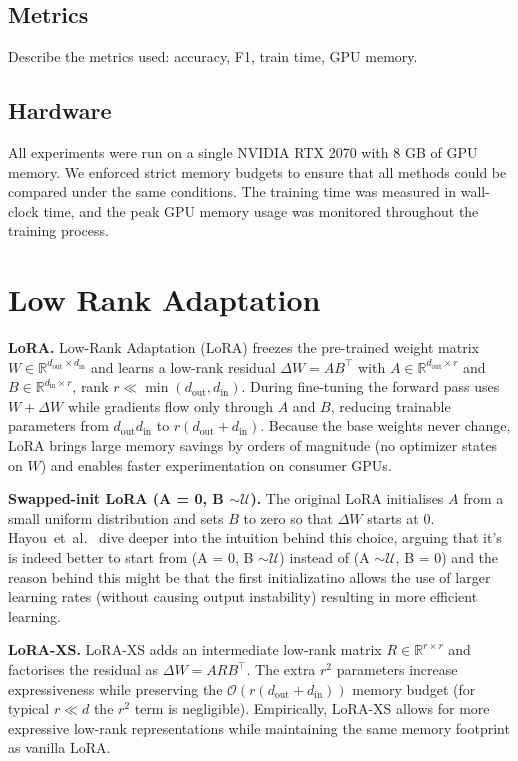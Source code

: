 \documentclass[a4paper,10pt,twocolumn,english]{article}
\begin{document}
\subsection{Metrics} Describe the metrics used: accuracy, F1, train time, GPU memory.

\subsection{Hardware} All experiments were run on a single NVIDIA RTX 2070 with 8 GB of GPU memory. We enforced strict memory budgets to ensure that all methods could be compared under the same conditions. The training time was measured in wall-clock time, and the peak GPU memory usage was monitored throughout the training process.

\section{Low Rank Adaptation}
\noindent\textbf{LoRA.}  Low-Rank Adaptation (LoRA) \cite{hu2021loralowrankadaptationlarge} freezes the pre-trained weight matrix $W\!\in\!\mathbb{R}^{d_{\text{out}}\times d_{\text{in}}}$ and learns a low-rank residual $\Delta W = A B^{\top}$ with $A\!\in\!\mathbb{R}^{d_{\text{out}}\times r}$ and $B\!\in\!\mathbb{R}^{d_{\text{in}}\times r}$, rank $r\!\ll\!\min(d_{\text{out}},d_{\text{in}})$.  During fine-tuning the forward pass uses $W+\Delta W$ while gradients flow only through $A$ and $B$, reducing trainable parameters from $d_{\text{out}}d_{\text{in}}$ to $r(d_{\text{out}}+d_{\text{in}})$.  Because the base weights never change, LoRA brings large memory savings by orders of magnitude (no optimizer states on $W$) and enables faster experimentation on consumer GPUs.

\noindent\textbf{Swapped-init LoRA (A = 0, B $\sim\mathcal{U}$).}  The original LoRA initialises $A$ from a small uniform distribution and sets $B$ to zero so that $\Delta W$ starts at 0.  Hayou~et~al.\ \cite{hayou2024impactinitializationlorafinetuning} dive deeper into the intuition behind this choice, arguing that it's is indeed better to start from (A = 0, B $\sim\mathcal{U}$) instead of (A $\sim\mathcal{U}$, B = 0) and the reason behind this might be that the first initializatino allows the use of larger learning rates (without causing output instability) resulting in more efficient learning.

\noindent\textbf{LoRA-XS.}  LoRA-XS \cite{balazy2024loraxslowrankadaptationextremely} adds an intermediate low-rank matrix $R\!\in\!\mathbb{R}^{r\times r}$ and factorises the residual as $\Delta W = A R B^{\top}$.  The extra $r^{2}$ parameters increase expressiveness while preserving the $\mathcal{O}(r(d_{\text{out}}+d_{\text{in}}))$ memory budget (for typical $r\!\ll\!d$ the $r^{2}$ term is negligible). Empirically, LoRA-XS allows for more expressive low-rank representations while maintaining the same memory footprint as vanilla LoRA.
\end{document}
